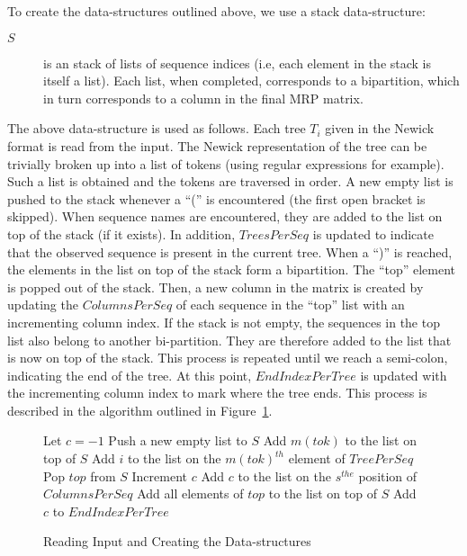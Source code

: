 \documentclass[a4paper,10pt]{article}
\begin{document}
To create the data-structures outlined above, we use a stack
data-structure:
\begin{description}
 \item[$S$] is an stack of lists of sequence indices (i.e, each element in the
stack is itself a list). Each list, when completed, corresponds to a
bipartition, which in turn corresponds to a column in the final MRP matrix.
 \end{description}
The above data-structure is used as follows. Each tree $T_i$ given in the Newick
format is read from the input. The Newick representation of the tree can
be trivially broken up into a list of tokens (using regular expressions for
example). Such a list is obtained and the tokens are traversed in order. 
A new empty list is pushed to the stack whenever a ``('' is encountered (the
first open bracket is skipped). When sequence names are encountered, they are
added to the list on top of the stack (if it exists). In addition, $TreesPerSeq$
is updated to indicate that the observed sequence is present in the current
tree. When a ``)'' is reached, the elements in the list on top of the stack form
a bipartition. The ``top'' element is popped out of the stack. Then, a new
column in the matrix is created by updating the $ColumnsPerSeq$ of each sequence
in the ``top'' list with an incrementing column index. If the stack is not
empty, the sequences in the top list also belong to another bi-partition. They
are therefore added to the list that is now on top of the stack. This process is
repeated until we reach a semi-colon, indicating the end of the tree. At this
point, $EndIndexPerTree$ is updated with the incrementing column index to mark
where the tree ends. This process is described in the algorithm outlined in
Figure~\ref{fig:alg-read}.

\begin{figure}[ht]
 \centering
\begin{algorithmic}[5]
\STATE Let $c=-1$
		      \STATE Push a new empty list to $S$
		\ENDIF
		      \STATE Add $m(tok)$ to the list on top of $S$
		      \STATE Add $i$ to the list on the $m(tok)^{th}$ element of
$TreePerSeq$
		\ENDIF
		      \STATE Pop $top$ from $S$
		      \STATE  Increment $c$
			\STATE Add $c$ to the list on the $s^{the}$ position
of $ColumnsPerSeq$
		      \ENDFOR
			  \STATE  Add all elements of $top$ to the list on top
of $S$
		      \ENDIF
		\ENDIF
		      \STATE Add $c$ to $EndIndexPerTree$
		\ENDIF
	\ENDFOR
\ENDFOR
\end{algorithmic}
 \caption{Reading Input and Creating the Data-structures}
 \label{fig:alg-read}
\end{figure}
\end{document}
